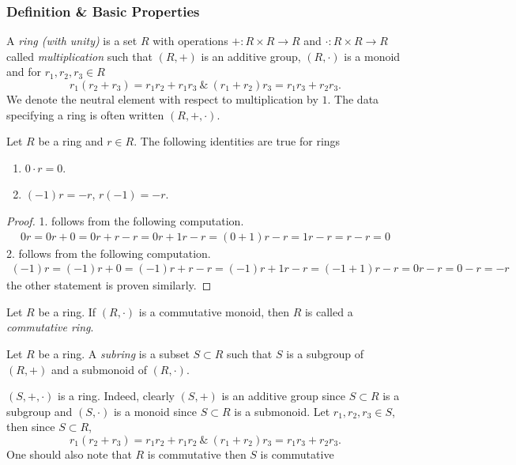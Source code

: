 \subsubsection{Definition \& Basic Properties}
\begin{definition}
    A \textit{ring (with unity)} is a set $R$ with operations $+: R\times R \rightarrow R$ and $\cdot: R\times R \rightarrow R$ called \textit{multiplication} such that $(R,+)$ is an additive group, $(R,\cdot)$ is a monoid and for $r_1,r_2,r_3\in R$
    $$r_1(r_2+r_3) = r_1r_2+r_1r_3 \ \& \ (r_1+r_2)r_3 = r_1r_3+r_2r_3.$$
    We denote the neutral element with respect to multiplication by $1$. The data specifying a ring is often written $(R,+,\cdot)$. 
\end{definition}
\begin{lemma}\label{ImportantRingIdentities}
    Let $R$ be a ring and $r\in R$. The following identities are true for rings
    \begin{enumerate}
        \item $0\cdot r = 0$.
        \item $(-1)r = -r $, $r(-1) = -r$.
    \end{enumerate}
\end{lemma}
\begin{proof}
    1. follows from the following computation.
    \begin{align*}
        0r = 0r + 0 = 0r+r-r = 0r+1r-r=(0+1)r-r = 1r-r=r-r=0
    \end{align*}
    2. follows from the following computation.
    \begin{align*}
       (-1)r = (-1)r+0 = (-1)r+r-r = (-1)r+1r-r=(-1+1)r-r = 0r-r=0-r=-r
    \end{align*}
    the other statement is proven similarly.  
\end{proof}
\begin{definition}
    Let $R$ be a ring. If $(R,\cdot)$ is a commutative monoid, then $R$ is called a \textit{commutative ring}.  
\end{definition}
\begin{definition}
    Let $R$ be a ring. A \textit{subring} is a subset $S\subset R$ such that $S$ is a subgroup of $(R,+)$ and a submonoid of $(R,\cdot)$. 
\end{definition}
\begin{remark}\label{CommutativeRingRemark}
    $(S,+,\cdot)$ is a ring. Indeed, clearly $(S,+)$ is an additive group since $S\subset R$ is a subgroup and $(S,\cdot)$ is a monoid since $S\subset R$ is a submonoid. Let $r_1,r_2,r_3\in S$, then since $S\subset R$,
    $$r_1(r_2+r_3)= r_1r_2+r_1r_2 \ \& \ (r_1+r_2)r_3=r_1r_3+r_2r_3.$$
    One should also note that $R$ is commutative then $S$ is commutative
\end{remark}
